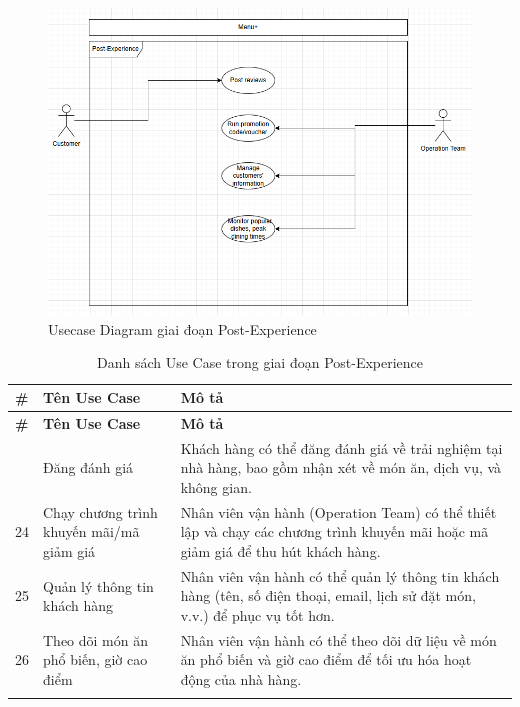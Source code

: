         \begin{figure}[H]
	\centering
	\includegraphics[width=\linewidth]{Images/ucd-postexp.png}
	\caption{Usecase Diagram giai đoạn Post-Experience}
        \end{figure}
        
        \begin{longtable}{|p{1cm}|p{5cm}|p{9cm}|}
        \hline
        \textbf{\#} & \textbf{Tên Use Case} & \textbf{Mô tả} \\ 
        \hline
        \endfirsthead
        \hline
        \textbf{\#} & \textbf{Tên Use Case} & \textbf{Mô tả} \\ 
        \endhead
        \hline
        \endfoot
        \hline
        \endlastfoot
        23 & Đăng đánh giá & Khách hàng có thể đăng đánh giá về trải nghiệm tại nhà hàng, bao gồm nhận xét về món ăn, dịch vụ, và không gian. \\ 
        \hline
        24 & Chạy chương trình khuyến mãi/mã giảm giá & Nhân viên vận hành (Operation Team) có thể thiết lập và chạy các chương trình khuyến mãi hoặc mã giảm giá để thu hút khách hàng. \\ 
        \hline
        25 & Quản lý thông tin khách hàng & Nhân viên vận hành có thể quản lý thông tin khách hàng (tên, số điện thoại, email, lịch sử đặt món, v.v.) để phục vụ tốt hơn. \\ 
        \hline
        26 & Theo dõi món ăn phổ biến, giờ cao điểm & Nhân viên vận hành có thể theo dõi dữ liệu về món ăn phổ biến và giờ cao điểm để tối ưu hóa hoạt động của nhà hàng. \\ 
        \hline
        \caption{Danh sách Use Case trong giai đoạn Post-Experience}\\
        \end{longtable}

